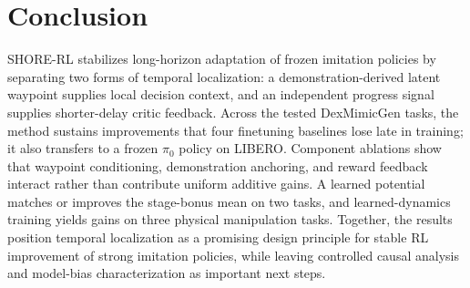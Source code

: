 \documentclass[letterpaper]{article} %
\begin{document}
\section{Conclusion}
SHORE-RL stabilizes long-horizon adaptation of frozen imitation policies by
separating two forms of temporal localization: a demonstration-derived latent
waypoint supplies local decision context, and an independent progress signal
supplies shorter-delay critic feedback. Across the tested DexMimicGen tasks,
the method sustains improvements that four finetuning baselines lose late in
training; it also transfers to a frozen $\pi_0$ policy on LIBERO. Component
ablations show that waypoint conditioning, demonstration anchoring, and reward
feedback interact rather than contribute uniform additive gains. A learned
potential matches or improves the stage-bonus mean on two tasks, and
learned-dynamics training yields gains on three physical manipulation tasks.
Together, the results position temporal localization as a promising design
principle for stable RL improvement of strong imitation policies, while
leaving controlled causal analysis and model-bias characterization as
important next steps.

\clearpage

\end{document}
